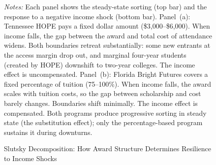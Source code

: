 \begin{figure}[t]

\caption{Slutsky Decomposition: How Award Structure Determines
  Resilience to Income Shocks}
\label{fig:decomposition}

\vspace{1mm}
\begin{minipage}{0.92\textwidth}
  \footnotesize
  \textit{Notes:} Each panel shows the steady-state sorting (top bar)
  and the response to a negative income shock (bottom bar). Panel~(a):
  Tennessee HOPE pays a fixed dollar amount (\$3,000--\$6,000). When
  income falls, the gap between the award and total cost of attendance
  widens. Both boundaries retreat substantially: some new entrants at
  the access margin drop out, and marginal four-year students (created
  by HOPE) downshift to two-year colleges. The income effect is
  uncompensated. Panel~(b): Florida Bright Futures covers a fixed
  percentage of tuition (75--100\%). When income falls, the award
  scales with tuition costs, so the gap between scholarship and cost
  barely changes. Boundaries shift minimally. The income effect is
  compensated. Both programs produce progressive sorting in steady
  state (the substitution effect); only the percentage-based program
  sustains it during downturns.
\end{minipage}
\end{figure}
